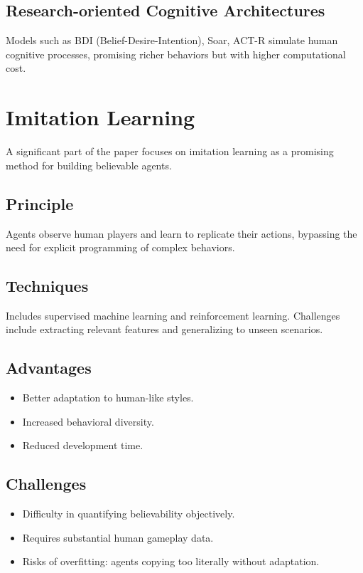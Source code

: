 \documentclass[a4paper,11pt]{article}
\begin{document}
\subsection{Research-oriented Cognitive Architectures}
Models such as BDI (Belief-Desire-Intention), Soar, ACT-R simulate human cognitive processes, promising richer behaviors but with higher computational cost.

\section{Imitation Learning}

A significant part of the paper focuses on imitation learning as a promising method for building believable agents.

\subsection{Principle}
Agents observe human players and learn to replicate their actions, bypassing the need for explicit programming of complex behaviors.

\subsection{Techniques}
Includes supervised machine learning and reinforcement learning. Challenges include extracting relevant features and generalizing to unseen scenarios.

\subsection{Advantages}
\begin{itemize}
    \item Better adaptation to human-like styles.
    \item Increased behavioral diversity.
    \item Reduced development time.
\end{itemize}

\subsection{Challenges}
\begin{itemize}
    \item Difficulty in quantifying believability objectively.
    \item Requires substantial human gameplay data.
    \item Risks of overfitting: agents copying too literally without adaptation.
\end{itemize}
\end{document}
